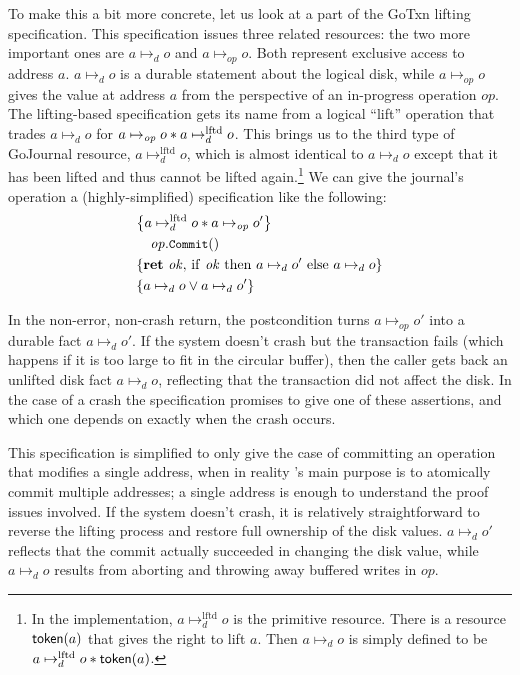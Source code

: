 \newcommand{\mapstoDisk}{\mapsto_d}
\newcommand{\mapstoOp}{\mapsto_{\mathit{op}}}
\newcommand{\mapstoLftd}{\mapsto_d^{\mathrm{lftd}}}
\newcommand{\jrnlToken}[1]{\textlog{token}(#1)}

To make this a bit more concrete, let us look at a part of the GoTxn lifting
specification. This specification issues three related resources: the two more important
ones are $a \mapstoDisk o$ and $a \mapstoOp o$. Both represent exclusive
access to address $a$. $a \mapstoDisk o$ is a durable statement about the
logical disk, while $a \mapstoOp o$ gives the value at address $a$ from the
perspective of an in-progress operation $op$. The lifting-based specification
gets its name from a logical ``lift'' operation that trades $a \mapstoDisk o$
for $a \mapstoOp o \sep a \mapstoLftd o$. This brings us to the
third type of GoJournal resource, $a \mapstoLftd o$, which is
almost identical to $a \mapstoDisk o$ except that it has been lifted and thus
cannot be lifted again.\footnote{In the implementation,
$a \mapstoLftd o$ is the primitive resource. There is a
resource $\jrnlToken{a}$ that gives the right to lift $a$. Then
$a \mapstoDisk o$ is simply defined to be
$a \mapstoLftd o \sep \jrnlToken{a}$.} We can give
the journal's  operation a
(highly-simplified) specification like the following:
%
\begin{align*}
  \hoareCV{a \mapstoLftd o \sep a \mapstoOp o'} %
  {\mathit{op}.\cc{Commit}()}%
  {\Ret{\mathit{ok}} \mathrm{if~} \mathit{ok} %
  \mathrm{~then~} a \mapstoDisk o' \mathrm{~else~} a \mapstoDisk o}%
  {a \mapstoDisk o \lor a \mapstoDisk o'}
\end{align*}

In the non-error, non-crash return, the postcondition turns $a \mapstoOp o'$
into a durable fact $a \mapstoDisk o'$. If the system doesn't crash but the
transaction fails (which happens if it is too large to fit in the circular
buffer), then the caller gets back an unlifted disk fact $a \mapstoDisk o$,
reflecting that the transaction did not affect the disk. In the case of a crash
the specification promises to give one of these assertions, and which one
depends on exactly when the crash occurs.

This specification is simplified to only give the case of committing an
operation that modifies a single address, when in reality 's main purpose
is to atomically commit multiple addresses; a single address is enough to
understand the proof issues involved. If the system doesn't crash, it is
relatively straightforward to reverse the lifting process and restore full
ownership of the disk values. $a \mapstoDisk o'$ reflects that the commit
actually succeeded in changing the disk value, while $a \mapstoDisk o$ results
from aborting and throwing away buffered writes in $op$.

